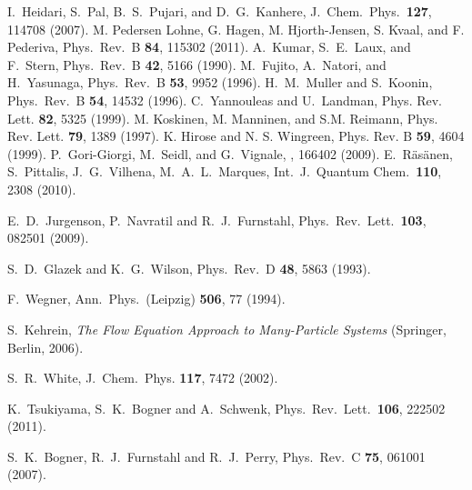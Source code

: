 \documentclass[twocolumn]{revtex4}
\begin{document}
\begin{thebibliography}{200}
 I.~Heidari, S.~Pal, B.~S.~Pujari, and D.~G.~Kanhere, J.~Chem.~Phys.~{\bf 127}, 
114708 (2007).
 M. Pedersen Lohne, G. Hagen, M. Hjorth-Jensen, S. Kvaal, and F. Pederiva, Phys.~Rev.~B {\bf 84}, 115302 (2011).
 A.~Kumar, S.~E.~Laux, and F.~Stern, Phys.~Rev.~B {\bf 42}, 5166 (1990).
 M.~Fujito, A.~Natori, and H.~Yasunaga, Phys.~Rev.~B {\bf 53}, 9952 (1996).
 H.~M.~Muller and S.~Koonin, Phys.~Rev.~B {\bf 54}, 14532 (1996).
 C.~Yannouleas and U.~Landman, Phys. Rev. Lett. {\bf 82}, 5325 (1999).
 M. Koskinen, M. Manninen, and S.M. Reimann, Phys. Rev. Lett. {\bf 79}, 1389 (1997).
 K. Hirose and N. S. Wingreen, Phys. Rev. B {\bf 59}, 4604 (1999).
 P.~Gori-Giorgi, M.~Seidl, and G.~Vignale, , 166402 (2009).
 E.~R\"as\"anen, S.~Pittalis, J.~G.~Vilhena, M.~A.~L.~Marques, Int.~J.~Quantum Chem.~{\bf 110}, 2308 (2010). 

 E.\ D.\ Jurgenson, P.\ Navratil and 
R.\ J.\ Furnstahl, Phys.\ Rev.\ Lett.\ {\bf 103}, 082501 (2009).

 S.\ D.\ Glazek and K.\ G.\ Wilson, Phys.\ Rev.\ D
{\bf 48}, 5863 (1993).

 F.\ Wegner, Ann.\ Phys.\ (Leipzig) {\bf 506}, 77 (1994).

 S.\ Kehrein, {\it The Flow Equation Approach to 
Many-Particle Systems} (Springer, Berlin, 2006).

 S.\ R.\ White, J.\ Chem.\ Phys. {\bf 117}, 7472 (2002).


 K.\ Tsukiyama, S.\ K.\ Bogner and A.\ Schwenk, Phys.~Rev.~Lett.~{\bf 106}, 222502 (2011).

 S.\ K.\ Bogner, R.\ J.\ Furnstahl and R.\ J.\ Perry,
Phys.\ Rev.\ C {\bf 75}, 061001 (2007).
\end{thebibliography}
\end{document}
